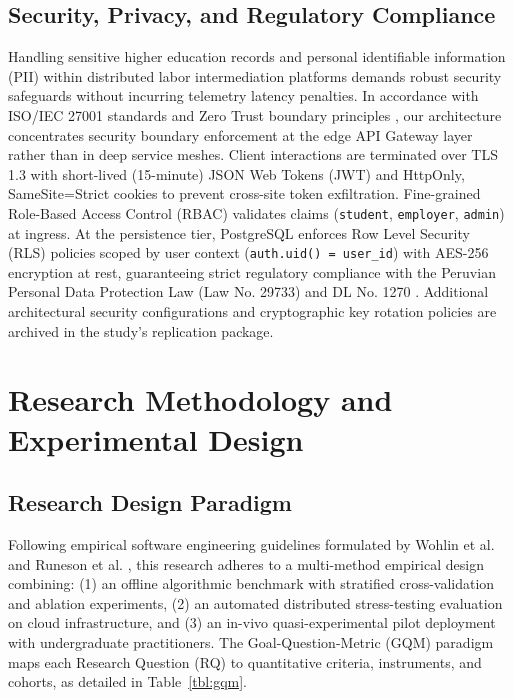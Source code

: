 \documentclass[a4paper,fleqn]{cas-dc}
\begin{document}
\subsection{Security, Privacy, and Regulatory Compliance}
Handling sensitive higher education records and personal identifiable information (PII) within distributed labor intermediation platforms demands robust security safeguards without incurring telemetry latency penalties. In accordance with ISO/IEC 27001 standards \cite{iso27001} and Zero Trust boundary principles \cite{alboqmi2025}, our architecture concentrates security boundary enforcement at the edge API Gateway layer rather than in deep service meshes. Client interactions are terminated over TLS 1.3 with short-lived (15-minute) JSON Web Tokens (JWT) and HttpOnly, SameSite=Strict cookies to prevent cross-site token exfiltration. Fine-grained Role-Based Access Control (RBAC) validates claims (\texttt{student}, \texttt{employer}, \texttt{admin}) at ingress. At the persistence tier, PostgreSQL enforces Row Level Security (RLS) policies scoped by user context (\texttt{auth.uid() = user\_id}) with AES-256 encryption at rest, guaranteeing strict regulatory compliance with the Peruvian Personal Data Protection Law (Law No. 29733) \cite{ley29733} and DL No. 1270 \cite{dl1270}. Additional architectural security configurations and cryptographic key rotation policies are archived in the study's replication package.

\section{Research Methodology and Experimental Design}
\label{sec:methodology}

\subsection{Research Design Paradigm}
Following empirical software engineering guidelines formulated by Wohlin et al. \cite{wohlin2012} and Runeson et al. \cite{runeson2012}, this research adheres to a multi-method empirical design combining: (1) an offline algorithmic benchmark with stratified cross-validation and ablation experiments, (2) an automated distributed stress-testing evaluation on cloud infrastructure, and (3) an in-vivo quasi-experimental pilot deployment with undergraduate practitioners. The Goal-Question-Metric (GQM) paradigm maps each Research Question (RQ) to quantitative criteria, instruments, and cohorts, as detailed in Table~\ref{tbl:gqm}.
\end{document}
